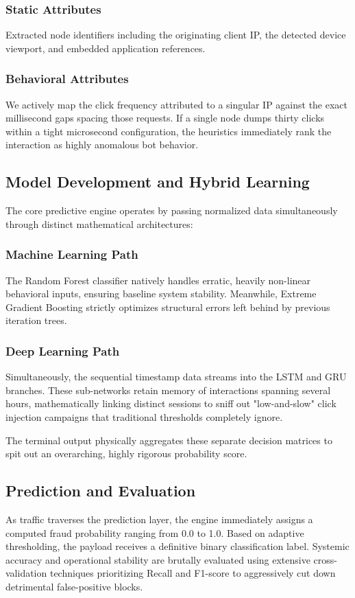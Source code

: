 \documentclass[conference]{IEEEtran}
\begin{document}
\subsubsection{Static Attributes}
Extracted node identifiers including the originating client IP, the detected device viewport, and embedded application references.
\subsubsection{Behavioral Attributes}
We actively map the click frequency attributed to a singular IP against the exact millisecond gaps spacing those requests. If a single node dumps thirty clicks within a tight microsecond configuration, the heuristics immediately rank the interaction as highly anomalous bot behavior.

\subsection{Model Development and Hybrid Learning}
The core predictive engine operates by passing normalized data simultaneously through distinct mathematical architectures:
\subsubsection{Machine Learning Path}
The Random Forest classifier natively handles erratic, heavily non-linear behavioral inputs, ensuring baseline system stability. Meanwhile, Extreme Gradient Boosting strictly optimizes structural errors left behind by previous iteration trees.
\subsubsection{Deep Learning Path}
Simultaneously, the sequential timestamp data streams into the LSTM and GRU branches. These sub-networks retain memory of interactions spanning several hours, mathematically linking distinct sessions to sniff out "low-and-slow" click injection campaigns that traditional thresholds completely ignore. 

The terminal output physically aggregates these separate decision matrices to spit out an overarching, highly rigorous probability score. 

\subsection{Prediction and Evaluation}
As traffic traverses the prediction layer, the engine immediately assigns a computed fraud probability ranging from 0.0 to 1.0. Based on adaptive thresholding, the payload receives a definitive binary classification label. Systemic accuracy and operational stability are brutally evaluated using extensive cross-validation techniques prioritizing Recall and F1-score to aggressively cut down detrimental false-positive blocks.
\end{document}
